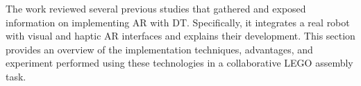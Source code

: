 \begin{enumerate}






The work reviewed several previous studies that gathered and exposed information on implementing \ac{AR} with \ac{DT}. Specifically, it integrates a real robot with visual and haptic \ac{AR} interfaces and explains their development. This section provides an overview of the implementation techniques, advantages, and experiment performed using these technologies in a collaborative LEGO assembly task.


\end{enumerate}
